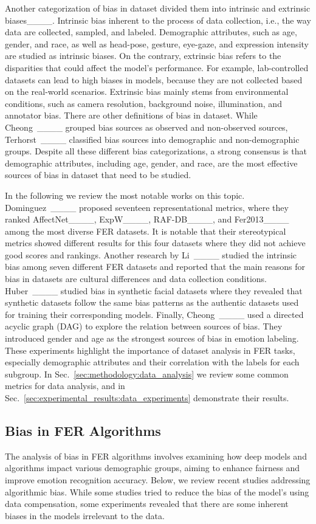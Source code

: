 Another categorization of bias in dataset divided them into intrinsic and extrinsic biases____. Intrinsic bias inherent to the process of data collection, i.e., the way data are collected, sampled, and labeled. Demographic attributes, such as age, gender, and race, as well as head-pose, gesture, eye-gaze, and expression intensity are studied as intrinsic biases. On the contrary, extrinsic bias refers to the disparities that could affect the model's performance. For example, lab-controlled datasets can lead to high biases in models, because they are not collected based on the real-world scenarios. Extrinsic bias mainly stems from environmental conditions, such as camera resolution, background noise, illumination, and annotator bias. There are other definitions of bias in dataset. While Cheong~\etal____ grouped bias sources as observed and non-observed sources, Terhorst~\etal____ classified bias sources into demographic and non-demographic groups. Despite all these different bias categorizations, a strong consensus is that demographic attributes, including age, gender, and race, are the most effective sources of bias in dataset that need to be studied.

In the following we review the most notable works on this topic. Dominguez~\etal____ proposed seventeen representational metrics, where they ranked AffectNet____, ExpW____, RAF-DB____, and Fer2013____ among the most diverse FER datasets. It is notable that their stereotypical metrics showed different results for this four datasets where they did not achieve good scores and rankings. Another research by Li~\etal____ studied the intrinsic bias among seven different FER datasets and reported that the main reasons for bias in datasets are cultural differences and data collection conditions. Huber~\etal____ studied bias in synthetic facial datasets where they revealed that synthetic datasets follow the same bias patterns as the authentic datasets used for training their corresponding models. Finally, Cheong~\etal____ used a directed acyclic graph (DAG) to explore the relation between sources of bias. They introduced gender and age as the strongest sources of bias in emotion labeling. These experiments highlight the importance of dataset analysis in FER tasks, especially demographic attributes and their correlation with the labels for each subgroup. In Sec.~\ref{sec:methodology:data_analysis} we review some common metrics for data analysis, and in Sec.~\ref{sec:experimental_results:data_experiments} demonstrate their results.

\subsection{Bias in FER Algorithms} 
\label{sec:literature_review:bias_in_fer_algorithms}
The analysis of bias in  FER algorithms involves examining how deep models and algorithms impact various demographic groups, aiming to enhance fairness and improve emotion recognition accuracy. Below, we review recent studies addressing algorithmic bias. While some studies tried to reduce the bias of the model's using data compensation, some experiments revealed that there are some inherent biases in the models irrelevant to the data.


